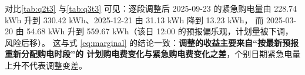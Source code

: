 对比\cref{tab:q2t3} 与\cref{tab:q3t3} 可见\nobreak：逐段调整后 2025-09-23 的紧急购电量由
228.74 kWh 升到 330.42 kWh\nobreak、2025-12-21 由 31.13 kWh 降到 13.23 kWh\nobreak，
而 2025-03-20 由 54.68 kWh 升到 559.67 kWh（该日 12:00 的预报偏乐观\nobreak，计划量被下调\nobreak，风险后移\nobreak）\nobreak。
这与式 \eqref{eq:marginal} 的结论一致\nobreak：\textbf{调整的收益主要来自“按最新预报重新分配购电时段\nobreak”的
计划购电费变化与紧急购电费变化之差}\nobreak，个别日期紧急电量上升不代表调整变差\nobreak。

